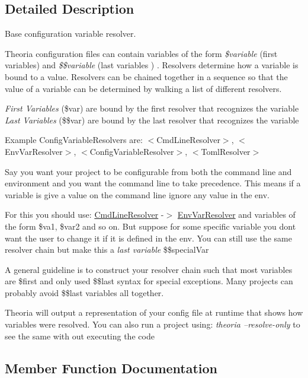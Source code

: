 \subsection{Detailed Description}
Base configuration variable resolver.

Theoria configuration files can contain variables of the form {\itshape \$variable} (\textquotesingle{}first variables\textquotesingle{}) and {\itshape \$\$variable} (\textquotesingle{}last variables \textquotesingle{}) . Resolvers determine how a variable is bound to a value. Resolvers can be chained together in a sequence so that the value of a variable can be determined by walking a list of different resolvers.

{\itshape First Variables} (\$var) are bound by the first resolver that recognizes the variable {\itshape Last Variables} (\$\$var) are bound by the last resolver that recognizes the variable

Example Config\+Variable\+Resolvers are\+: $<$\+Cmd\+Line\+Resolver$>$, $<$\+Env\+Var\+Resolver$>$, $<$\+Config\+Variable\+Resolver$>$, $<$\+Toml\+Resolver$>$

Say you want your project to be configurable from both the command line and environment and you want the command line to take precedence. This means if a variable is give a value on the command line ignore any value in the env.

For this you should use\+: \hyperlink{classtheoria_1_1config_1_1CmdLineResolver}{Cmd\+Line\+Resolver} -\/$>$ \hyperlink{classtheoria_1_1config_1_1EnvVarResolver}{Env\+Var\+Resolver} and variables of the form \$va1, \$var2 and so on. But suppose for some specific variable you don\textquotesingle{}t want the user to change it if it is defined in the env. You can still use the same resolver chain but make this a {\itshape last variable} \$\$special\+Var

A general guideline is to construct your resolver chain such that most variables are \$first and only used \$\$last syntax for special exceptions. Many projects can probably avoid \$\$last variables all together.

Theoria will output a representation of your config file at runtime that shows how variables were resolved. You can also run a project using\+: {\itshape theoria --resolve-\/only} to see the same with out executing the code 

\subsection{Member Function Documentation}
\mbox{\label{classtheoria_1_1config_1_1ConfigVariableResolver_a026bda729faf988eaef334a45ec92303}} 
